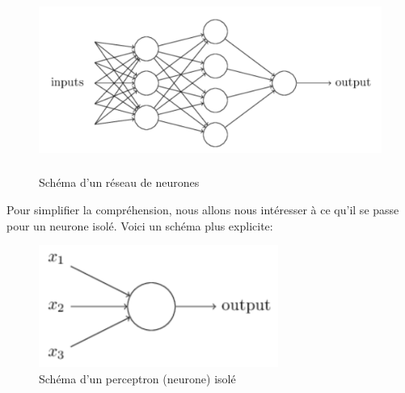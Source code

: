 \documentclass[12pt,a4paper]{extarticle}
\begin{document}
\begin{figure}[h]
        \centering
        \includegraphics[height=6cm]{neural_network}
        \caption{Schéma d'un réseau de neurones}
\end{figure}


Pour simplifier la compréhension, nous allons nous intéresser à ce qu'il se passe pour un neurone isolé. Voici un schéma plus explicite:

\begin{figure}[h]
        \centering
        \includegraphics[height=4cm]{perceptrons}
        \caption{Schéma d'un perceptron (neurone) isolé}
\end{figure}
\end{document}
